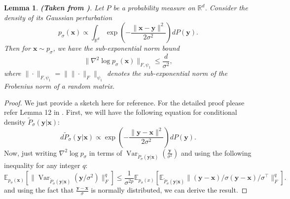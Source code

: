 \documentclass[11pt]{article}
\def\rvx{{\mathbf{x}}}
\def\rvy{{\mathbf{y}}}
\def\vx{{\bm{x}}}
\def\vy{{\bm{y}}}
\newtheorem{lemma}{Lemma}[section]
\begin{document}
\begin{lemma}
\label{adapted_from_improved}
\textbf{(Taken from \cite{chen2023improved})}. Let $P$ be a probability measure on $\mathbb{R}^d$. Consider the density of its Gaussian perturbation
\[
p_\sigma(\vx) \propto \int_{\mathbb{R}^d} \exp \left(- \frac{\|\vx - \vy\|^2}{2\sigma^2} \right) dP(\vy).
\]
Then for $\rvx \sim p_\sigma$, we have the sub-exponential norm bound
\[
\|\nabla^2 \log p_\sigma(\rvx)\|_{F, \psi_1} \leq \frac{d}{\sigma^2},
\]
where $\| \cdot \|_{F, \psi_1} = \| \| \cdot \|_F \|_{\psi_1}$ denotes the sub-exponential norm of the Frobenius norm of a random matrix.
\end{lemma}

\begin{proof}
We just provide a sketch here for reference. For the detailed proof please refer Lemma 12 in \cite{chen2023improved}.
First, we will have the following equation for conditional density
$\tilde{P}_\sigma(\vy|\vx)$:
\[
d\tilde{P}_\sigma(\vy|\vx) \propto \exp \left(- \frac{\|\vy - \vx\|^2}{2\sigma^2} \right) dP(\vy).
\]
Now, just writing $\nabla^2 \log p_\sigma$ in terms of $\operatorname{Var}_{\tilde{P}_\sigma(\vy|\vx)} \left( \frac{\vy}{\sigma^2} \right)$ and using the following inequality for any integer $q$:
\[
\mathbb{E}_{p_\sigma(\vx)} \left[ \| \operatorname{Var}_{\tilde{P}_\sigma(\vy|\vx)} ( \vy / \sigma^2 ) \|_F^q \right] \leq \frac{1}{\sigma^{2p}} \mathbb{E}_{p_\sigma(x)} \left[ \mathbb{E}_{\tilde{P}_\sigma(\vy|\vx)} \| (\vy - \vx)/\sigma (\vy - \vx)/\sigma^\top \|_F^q \right].
\]
and using the fact that $\frac{\rvy-\rvx}{\sigma}$ is normally distributed, we can derive the result.


\end{proof}
\end{document}
